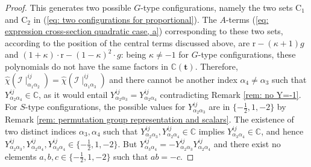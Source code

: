 \documentclass[10pt]{article}
\theoremstyle{remark}%
\theoremstyle{definition}%
\begin{document}
\begin{proof}
This generates two possible $G$-type configurations, namely the two sets $\mathrm{C}_{1}$ and $\mathrm{C}_{2}$ in (\ref{eq: two configurations for proportional}). The $A$-terms (\ref{eq: expression cross-section quadratic case, a}) corresponding to these two sets, according to the position of the central terms discussed above, are $\mathrm{r}-(\kappa+1)g$ and $(1+\kappa)\cdot\mathrm{r}-(1-\kappa)^{2}\cdot g$: being $\kappa \neq -1$ for $G$-type configurations, these polynomials do not have the same factors in $\mathbb{C}(\mathbf{t})$. Therefore, $\hat{\chi}(\mathcal{I}\mid_{\alpha_{1}\alpha_{2}}^{ij})=\hat{\chi}(\mathcal{I}\mid_{\alpha_{1}\alpha_{3}}^{ij})$ and there cannot be another index $\alpha_{4}\neq \alpha_{3}$ such that $Y_{\alpha_{2}\alpha_{4}}^{ij}\in\mathbb{C}$, as it would entail $Y_{\alpha_{2}\alpha_{3}}^{ij}=Y_{\alpha_{2}\alpha_{4}}^{ij}$  contradicting Remark \ref{rem: no Y=-1}. For $S$-type configurations, the possible values for $Y_{\alpha_{2}\alpha_{3}}^{ij}$ are in $\{-\frac{1}{2},1,-2\}$ by Remark \ref{rem: permutation group representation and scalars}. The existence of two distinct indices $\alpha_{3},\alpha_{4}$ such that $Y_{\alpha_{2}\alpha_{3}}^{ij},Y_{\alpha_{2}\alpha_{4}}^{ij}\in\mathbb{C}$ implies $Y_{\alpha_{3}\alpha_{4}}^{ij}\in\mathbb{C}$, and hence $Y_{\alpha_{2}\alpha_{3}}^{ij},Y_{\alpha_{2}\alpha_{4}}^{ij},Y_{\alpha_{3}\alpha_{4}}^{ij}\in\{-\frac{1}{2},1,-2\}$.
But $Y_{\alpha_{3}\alpha_{4}}^{ij}=-Y_{\alpha_{2}\alpha_{3}}^{ij}Y_{\alpha_{2}\alpha_{4}}^{ij}$ and there exist no elements $a,b,c\in\{-\frac{1}{2},1,-2\}$ such that $ab=-c$. 
\end{proof}
\end{document}
